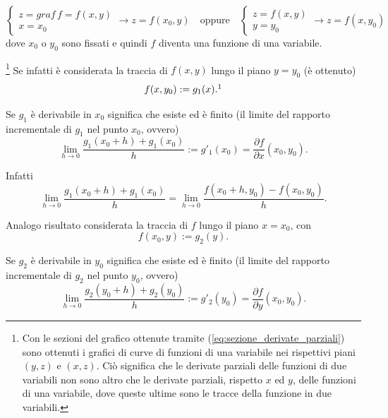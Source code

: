 \begin{equation}\label{eq:sezione_derivate_parziali}
    \begin{cases}
        z=graf\, f=f(x,y)\\
        x=x_0
    \end{cases}\rightarrow z=f(x_0,y)
    \quad\text{oppure}\quad
    \begin{cases}
        z=f(x,y)\\
        y=y_0
    \end{cases}\rightarrow z=f(x,y_0)
\end{equation}
dove $x_0$ o $y_0$ sono fissati e quindi $f$ diventa una funzione di una variabile.

\footnote{Con le sezioni del grafico ottenute tramite (\ref{eq:sezione_derivate_parziali}) sono ottenuti i grafici di curve di funzioni di una variabile nei rispettivi piani $(y,z)$ e $(x,z)$. Ciò significa che le derivate parziali delle funzioni di due variabili non sono altro che le derivate parziali, rispetto $x$ ed $y$, delle funzioni di una variabile, dove queste ultime sono le tracce della funzione in due variabili.} Se infatti è considerata la traccia di $f(x,y)$ lungo il piano $y=y_0$ (è ottenuto)
\begin{equation*}
    f(x,y_0):=g_1(x). \footnotemark
\end{equation*}

Se $g_1$ è derivabile in $x_0$ significa che esiste ed è finito (il limite del rapporto incrementale di $g_1$ nel punto $x_0$, ovvero)
\begin{equation*}
    \lim_{h\rightarrow 0}\frac{g_1(x_0+h)+g_1(x_0)}{h}:=g'_1(x_0)=\frac{\partial f}{\partial x}(x_0,y_0).
\end{equation*}

Infatti
\begin{equation*}
    \lim_{h\rightarrow 0}\frac{g_1(x_0+h)+g_1(x_0)}{h}=\lim_{h\rightarrow 0}\frac{f(x_0+h,y_0)-f(x_0,y_0)}{h}.
\end{equation*}

Analogo risultato considerata la traccia di $f$ lungo il piano $x=x_0$, con
\begin{equation*}
    f(x_0,y):=g_2(y).
\end{equation*}

Se $g_2$ è derivabile in $y_0$ significa che esiste ed è finito (il limite del rapporto incrementale di $g_2$ nel punto $y_0$, ovvero)
\begin{equation*}
    \lim_{h\rightarrow 0}\frac{g_2(y_0+h)+g_2(y_0)}{h}:=g'_2(y_0)=\frac{\partial f}{\partial y}(x_0,y_0).
\end{equation*}

